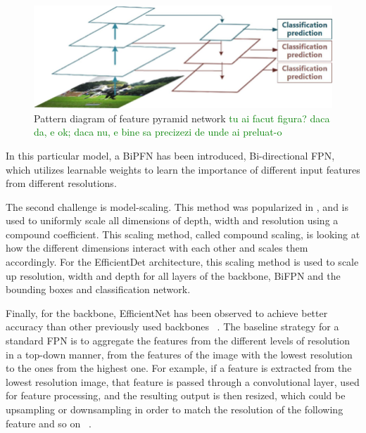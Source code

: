 \begin{figure}[!ht]
    \centering
    \includegraphics[width=0.7\linewidth]{figures/Figure5.png}
    \caption{Pattern diagram of feature pyramid network
    \textcolor{green}{tu ai facut figura? daca da, e ok; daca nu, e bine sa precizezi de unde ai preluat-o}}
    \label{fig:fig5}
\end{figure}

In this particular model, a BiPFN has been introduced, Bi-directional FPN, which utilizes learnable weights to learn the importance of different input features from different resolutions.

The second challenge is model-scaling. This method was popularized in \cite{carte10}, and is used to uniformly scale all dimensions of depth, width and resolution using a compound coefficient. This scaling method, called compound scaling, is looking at how the different dimensions interact with each other and scales them accordingly. For the EfficientDet architecture, this scaling method is used to scale up resolution, width and depth for all layers of the backbone, BiFPN and the bounding boxes and classification network.

Finally, for the backbone, EfficientNet has been observed to achieve better accuracy than other previously used backbones ~\cite{carte8}. 
The baseline strategy for a standard FPN is to aggregate the features from the different levels of resolution in a top-down manner, from the features of the image with the lowest resolution to the ones from the highest one. For example, if a feature is extracted from the lowest resolution image, that feature is passed through a convolutional layer, used for feature processing, and the resulting output is then resized, which could be upsampling or downsampling in order to match the resolution of the following feature and so on ~\cite{carte8}.

